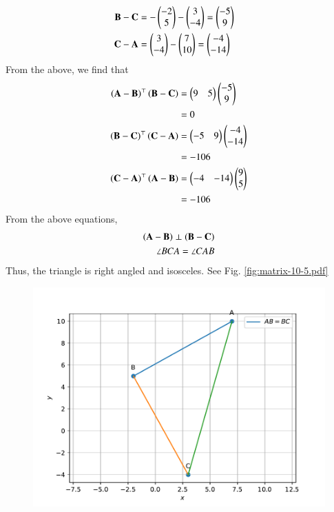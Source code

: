 \documentclass[journal,12pt,twocolumn]{IEEEtran}
\renewcommand\thesection{\arabic{section}}
\begin{document}
\begin{enumerate}[label=\thesection.\arabic*.,ref=\thesection.\theenumi]
\begin{align}
			\\
			\mathbf{B} -\mathbf{C}&=  -\begin{pmatrix}-2 \\ 5\end{pmatrix}-\begin{pmatrix}3 \\ -4\end{pmatrix} = \begin{pmatrix}-5 \\ 9\end{pmatrix}
			\\
			\mathbf{C} -\mathbf{A}&= \begin{pmatrix}3 \\ -4\end{pmatrix} -\begin{pmatrix}7 \\ 10\end{pmatrix} = \begin{pmatrix}-4 \\ -14\end{pmatrix}
		\end{align}
		From the above,  we find that 
		\begin{align}
			\left(\mathbf{A} -\mathbf{B}\right)^{\top}\left(\mathbf{B} -\mathbf{C}\right)&=  \begin{pmatrix}9 & 5\end{pmatrix}\begin{pmatrix}-5 \\ 9\end{pmatrix}
			\\
			&=0
			\\
			\left(\mathbf{B} -\mathbf{C}\right)^{\top}\left(\mathbf{C} -\mathbf{A}\right)&=  \begin{pmatrix}-5 & 9\end{pmatrix}\begin{pmatrix}-4 \\ -14\end{pmatrix}
\\
			&=-106
			\\
			\left(\mathbf{C} -\mathbf{A}\right)^{\top}\left(\mathbf{A} -\mathbf{B}\right)&=  \begin{pmatrix}-4 & -14\end{pmatrix}\begin{pmatrix}9 \\ 5\end{pmatrix}
\\
			&=-106
		\end{align}
		From  the above equations, 
		\begin{align}
			\left(\mathbf{A} -\mathbf{B}\right)\perp \left(\mathbf{B} -\mathbf{C}\right)
			\\
			\angle BCA = 
			\angle CAB  
		\end{align}
		Thus, the triangle is right angled and isosceles.
    See Fig. 
	  \ref{fig:matrix-10-5.pdf}
  \begin{figure}
	  \centering 
	  \includegraphics[width=\columnwidth]{figs/matrix-10-5.pdf}

\end{figure}
\end{enumerate}
\end{document}
